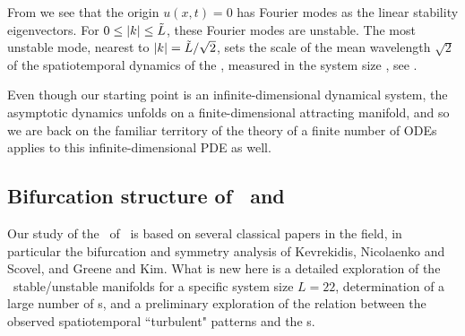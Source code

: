 From  we see that the origin $u(x,t) = 0$
has Fourier modes as the  linear
stability eigenvectors.
For $0 \leq |k| \leq \tilde{L}$, these Fourier modes are
unstable.
The most unstable mode, nearest to $|k|=\tilde{L}/\sqrt{2}$,
sets the scale of the mean wavelength $\sqrt{2}$
of the spatiotemporal dynamics of the {\KSe},
measured in the system size \tildeL, see .


%
%

Even though our starting point
is an infinite-dimensional dynamical system, the asymptotic dynamics
unfolds on a finite-dimensional attracting manifold, and so we are back on
the familiar territory of
the theory of a finite number of ODEs applies to this
infinite-dimensional PDE as well.

\subsection{Bifurcation structure of \eqva\ and \reqva}%
\label{sec:KSlit}
%

Our study of the \eqva\ of
\KSe\ is based on several classical papers in the field,
in particular the bifurcation and symmetry analysis of
Kevrekidis, Nicolaenko and Scovel,
and Greene and Kim. What is new here is
a detailed exploration of the \eqva\ stable/unstable manifolds
for a specific system size $L = 22$, determination
of a large number of \rpo s, and a preliminary
exploration of the relation between the
observed spatiotemporal ``turbulent" patterns and
the \rpo s.


